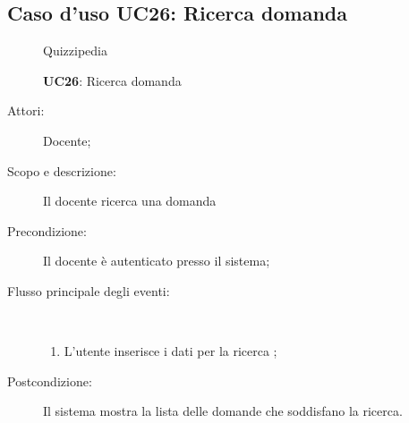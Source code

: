 \subsection{Caso d'uso UC26: Ricerca domanda}
\begin{figure}[H]
	\centering
	\begin{resizedtikzpicture}{\textwidth}
		\begin{umlsystem}[x=0, fill=lightgray!20]{Quizzipedia}
		\end{umlsystem}
	\end{resizedtikzpicture}
	\caption{\textbf{UC26}: Ricerca domanda}
	\label{UC26}
\end{figure}
\begin{description}
	\item[Attori:] Docente;
	\item[Scopo e descrizione:] Il docente ricerca una domanda
	\item[Precondizione:] Il docente è autenticato presso il sistema;
	
	\item[Flusso principale degli eventi:] \ 
	\begin{enumerate}
		\item L'utente inserisce i dati per la ricerca	;
		
	\end{enumerate}
	\item[Postcondizione:] Il sistema mostra la lista delle domande che soddisfano la ricerca.
\end{description}
\hypertarget{UC27}{}
